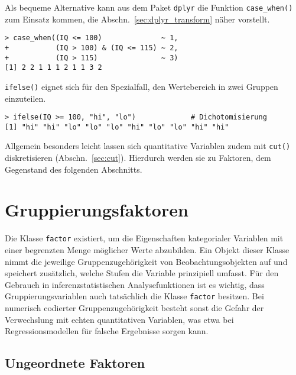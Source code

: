 Als bequeme Alternative kann aus dem Paket \lstinline!dplyr! die Funktion \lstinline!case_when()! zum Einsatz kommen, die Abschn.\ \ref{sec:dplyr_transform} näher vorstellt.
\begin{lstlisting}
> case_when((IQ <= 100)              ~ 1,
+           (IQ > 100) & (IQ <= 115) ~ 2,
+           (IQ > 115)               ~ 3)
[1] 2 2 1 1 1 2 1 1 3 2
\end{lstlisting}

\lstinline!ifelse()! eignet sich für den Spezialfall, den Wertebereich in zwei Gruppen einzuteilen.
\begin{lstlisting}
> ifelse(IQ >= 100, "hi", "lo")             # Dichotomisierung
[1] "hi" "hi" "lo" "lo" "lo" "hi" "lo" "lo" "hi" "hi"
\end{lstlisting}

Allgemein besonders leicht lassen sich quantitative Variablen zudem mit \lstinline!cut()! diskretisieren (Abschn.\ \ref{sec:cut}). Hierdurch werden sie zu Faktoren, dem Gegenstand des folgenden Abschnitts.

\section{Gruppierungsfaktoren}
\label{sec:factor}

Die Klasse \lstinline!factor! existiert, um die Eigenschaften kategorialer Variablen mit einer begrenzten Menge möglicher Werte abzubilden. Ein Objekt dieser Klasse nimmt die jeweilige Gruppenzugehörigkeit von Beobachtungsobjekten auf und speichert zusätzlich, welche Stufen die Variable prinzipiell umfasst. Für den Gebrauch in inferenzstatistischen Analysefunktionen ist es wichtig, dass Gruppierungsvariablen auch tatsächlich die Klasse \lstinline!factor! besitzen. Bei numerisch codierter Gruppenzugehörigkeit besteht sonst die Gefahr der Verwechslung mit echten quantitativen Variablen, was etwa bei Regressionsmodellen für falsche Ergebnisse sorgen kann.

\subsection{Ungeordnete Faktoren}

